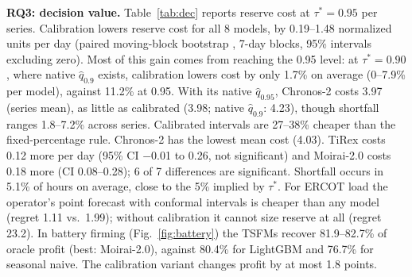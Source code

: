 \documentclass[conference]{IEEEtran}
\begin{document}
\textbf{RQ3: decision value.} Table~\ref{tab:dec} reports reserve cost at $\tau^*=0.95$ per series. Calibration lowers reserve cost for all 8 models, by 0.19--1.48 normalized units per day (paired moving-block bootstrap \cite{kunsch1989}, 7-day blocks, 95\% intervals excluding zero). Most of this gain comes from reaching the 0.95 level: at $\tau^*=0.90$, where native $\hat q_{0.9}$ exists, calibration lowers cost by only 1.7\% on average (0--7.9\% per model), against 11.2\% at 0.95. With its native $\hat q_{0.95}$, Chronos-2 costs 3.97 (series mean), as little as calibrated (3.98; native $\hat q_{0.9}$: 4.23), though shortfall ranges 1.8--7.2\% across series. Calibrated intervals are 27--38\% cheaper than the fixed-percentage rule. Chronos-2 has the lowest mean cost (4.03). TiRex costs 0.12 more per day (95\% CI $-$0.01 to 0.26, not significant) and Moirai-2.0 costs 0.18 more (CI 0.08--0.28); 6 of 7 differences are significant. Shortfall occurs in 5.1\% of hours on average, close to the 5\% implied by $\tau^*$. For ERCOT load the operator's point forecast with conformal intervals is cheaper than any model (regret 1.11 vs.\ 1.99); without calibration it cannot size reserve at all (regret 23.2). In battery firming (Fig.~\ref{fig:battery}) the TSFMs recover 81.9--82.7\% of oracle profit (best: Moirai-2.0), against 80.4\% for LightGBM and 76.7\% for seasonal naive. The calibration variant changes profit by at most 1.8 points.
\end{document}
